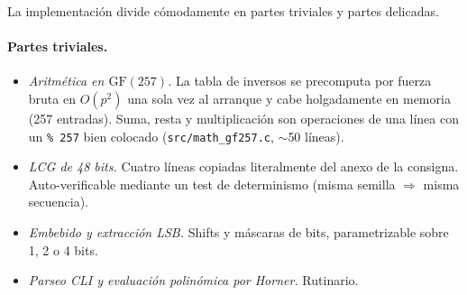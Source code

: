 \documentclass[11pt,a4paper]{article}
\begin{document}
La implementación divide cómodamente en partes triviales y partes
delicadas.

\paragraph{Partes triviales.}
\begin{itemize}[leftmargin=*,nosep]
    \item \emph{Aritmética en $\mathrm{GF}(257)$.} La tabla de inversos se
          precomputa por fuerza bruta en $O(p^2)$ una sola vez al arranque
          y cabe holgadamente en memoria (257 entradas). Suma, resta y
          multiplicación son operaciones de una línea con un
          \texttt{\%\,257} bien colocado
          (\texttt{src/math\_gf257.c}, $\sim$50 líneas).
    \item \emph{LCG de 48 bits.} Cuatro líneas copiadas literalmente del
          anexo de la consigna. Auto-verificable mediante un test de
          determinismo (misma semilla $\Rightarrow$ misma secuencia).
    \item \emph{Embebido y extracción LSB.} Shifts y máscaras de bits,
          parametrizable sobre 1, 2 o 4 bits.
    \item \emph{Parseo CLI y evaluación polinómica por Horner.} Rutinario.
\end{itemize}
\end{document}
